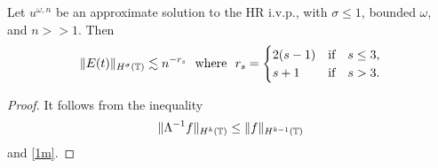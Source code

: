 %
%
%
\begin{lemma}
\label{lem:error_of_approx_solution}
Let $u^{\omega,n}$ be an approximate solution to the HR i.v.p., with 
$\sigma \le 1$, bounded $\omega$, and $n >> 1$.
Then 
%
%
\begin{equation}
\label{total-error-approx-solution}
\begin{split}
\|E(t)\|_{H^\sigma(\mathbb{T})} \lesssim n^{-r_s} \ \ \text{where} \ \ r_s = 
\begin{cases}
2(s-1)   & \text{if} \quad s \le 3,\\  s+1  & \text{if} \quad s > 3. \\
\end{cases}
\end{split}
\end{equation}
%
%
%
%
\end{lemma}
%
%
%
%
%
%
%
\begin{proof} It follows from the inequality
%
%
%
%
\begin{equation*}
\begin{split}
\|\Lambda^{-1}f \|_{H^{k}(\mathbb{T})} \le
\|f\|_{H^{k-1}(\mathbb{T})}
\end{split}
\end{equation*}
and \eqref{1m}.
\end{proof}
%
%
%
%
%
%
%
%
%
%
